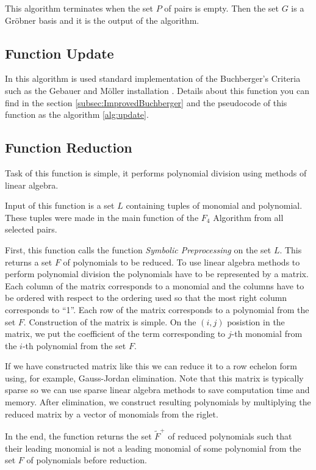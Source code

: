 This algorithm terminates when the set $P$ of pairs is empty. Then the set $G$ is a Gr\"obner basis and it is the output of the algorithm.



\subsection{Function Update}
In this algorithm is used standard implementation of the Buchberger's Criteria such as the Gebauer and M\"oller installation \cite{Gebauer-Moller88}. Details about this function you can find in the section \ref{subsec:ImprovedBuchberger} and the pseudocode of this function as the algorithm \ref{alg:update}.

\subsection{Function Reduction}
Task of this function is simple, it performs polynomial division using methods of linear algebra.

Input of this function is a set $L$ containing tuples of monomial and polynomial. These tuples were made in the main function of the $F_4$ Algorithm from all selected pairs.

First, this function calls the function \textit{Symbolic Preprocessing} on the set $L$. This returns a set $F$ of polynomials to be reduced. To use linear algebra methods to perform polynomial division the polynomials have to be represented by a matrix. Each column of the matrix corresponds to a monomial and the columns have to be ordered with respect to the ordering used so that the most right column corresponds to ``1''. Each row of the matrix corresponds to a polynomial from the set $F$. Construction of the matrix is simple. On the $(i, j)$ posistion in the matrix, we put the coefficient of the term corresponding to $j$-th monomial from the $i$-th polynomial from the set $F$.

If we have constructed matrix like this we can reduce it to a row echelon form using, for example, Gauss-Jordan elimination. Note that this matrix is typically sparse so we can use sparse linear algebra methods to save computation time and memory. After elimination, we construct resulting polynomials by multiplying the reduced matrix by a vector of monomials from the riglet.

In the end, the function returns the set $\tilde{F}^+$ of reduced polynomials such that their leading monomial is not a leading monomial of some polynomial from the set $F$ of polynomials before reduction.

